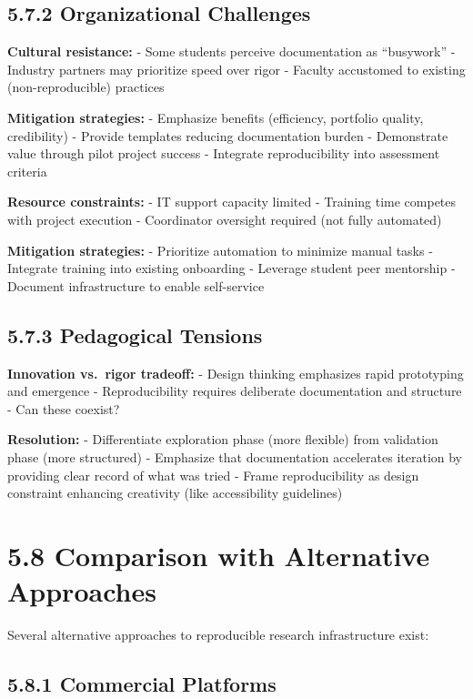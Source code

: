 \documentclass[
  oneside,
  open=any]{scrbook}
\begin{document}
\subsection{5.7.2 Organizational
Challenges}\label{organizational-challenges}

\textbf{Cultural resistance:} - Some students perceive documentation as
``busywork'' - Industry partners may prioritize speed over rigor -
Faculty accustomed to existing (non-reproducible) practices

\textbf{Mitigation strategies:} - Emphasize benefits (efficiency,
portfolio quality, credibility) - Provide templates reducing
documentation burden - Demonstrate value through pilot project success -
Integrate reproducibility into assessment criteria

\textbf{Resource constraints:} - IT support capacity limited - Training
time competes with project execution - Coordinator oversight required
(not fully automated)

\textbf{Mitigation strategies:} - Prioritize automation to minimize
manual tasks - Integrate training into existing onboarding - Leverage
student peer mentorship - Document infrastructure to enable self-service

\subsection{5.7.3 Pedagogical Tensions}\label{pedagogical-tensions}

\textbf{Innovation vs.~rigor tradeoff:} - Design thinking emphasizes
rapid prototyping and emergence - Reproducibility requires deliberate
documentation and structure - Can these coexist?

\textbf{Resolution:} - Differentiate exploration phase (more flexible)
from validation phase (more structured) - Emphasize that documentation
accelerates iteration by providing clear record of what was tried -
Frame reproducibility as design constraint enhancing creativity (like
accessibility guidelines)

\section{5.8 Comparison with Alternative
Approaches}\label{comparison-with-alternative-approaches}

Several alternative approaches to reproducible research infrastructure
exist:

\subsection{5.8.1 Commercial Platforms}\label{commercial-platforms}
\end{document}
